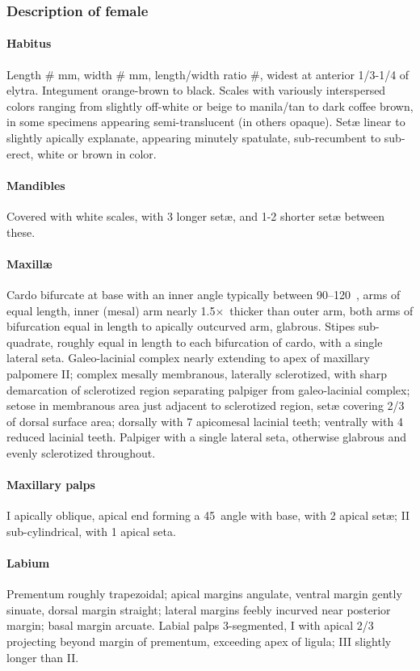 \documentclass[fleqn,10pt,lineno]{wlpeerj} %
\newcommand{\td}{\textdegree~}
\newcommand{\x}{$\times$~}
\begin{document}
		\subsubsection*{Description of female}
			\paragraph{Habitus}
				Length \# mm, width \# mm, length/width ratio \#, widest at anterior 1/3-1/4 of elytra.
				Integument orange-brown to black. 
				Scales with variously interspersed colors ranging from slightly off-white or beige to manila/tan to dark coffee brown, in some specimens appearing semi-translucent (in others opaque). 
				Set{\ae} linear to slightly apically explanate, appearing minutely spatulate, sub-recumbent to sub-erect, white or brown in color.
			\paragraph{Mandibles}
				Covered with white scales, with 3 longer set{\ae}, and 1-2 shorter set{\ae} between these.
			\paragraph{Maxill{\ae}}
				Cardo bifurcate at base with an inner angle typically between 90–120\td, arms of equal length, inner (mesal) arm nearly 1.5\x thicker than outer arm, both arms of bifurcation equal in length to apically outcurved arm, glabrous. 
				Stipes sub-quadrate, roughly equal in length to each bifurcation of cardo, with a single lateral seta. 
				Galeo-lacinial complex nearly extending to apex of maxillary palpomere II; complex mesally membranous, laterally sclerotized, with sharp demarcation of sclerotized region separating palpiger from galeo-lacinial complex; setose in membranous area just adjacent to sclerotized
region, set{\ae} covering 2/3 of dorsal surface area; dorsally with 7 apicomesal lacinial teeth; ventrally with 4 reduced lacinial teeth. 
				Palpiger with a single lateral seta, otherwise glabrous and evenly sclerotized throughout.
			\paragraph{Maxillary palps}
				I apically oblique, apical end forming a 45\td angle with base, with 2 apical set{\ae}; II sub-cylindrical, with 1 apical seta.
			\paragraph{Labium}
				Prementum roughly trapezoidal; apical margins angulate, ventral margin gently sinuate, dorsal margin straight; lateral margins feebly incurved near posterior margin; basal margin arcuate.
				Labial palps 3-segmented, I with apical 2/3 projecting beyond margin of prementum, exceeding apex of ligula; III slightly longer than II.
\end{document}
